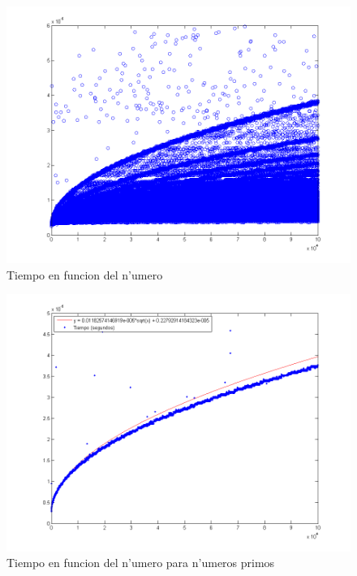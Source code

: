 \begin{figure}[H]
\centering
\includegraphics[scale=0.5]{../../codigo/ejercicio1/benchmark_de_tiempo/graficos/todos_los_numeros/todosLosNumerosPuntosTiempo.png}
\caption{Tiempo en funcion del n'umero}
\end{figure}

\begin{figure}[H]
\centering
\includegraphics[scale=0.5]{../../codigo/ejercicio1/benchmark_de_tiempo/graficos/primos/primosTiempo.png}
\caption{Tiempo en funcion del n'umero para n'umeros primos}
\end{figure}

